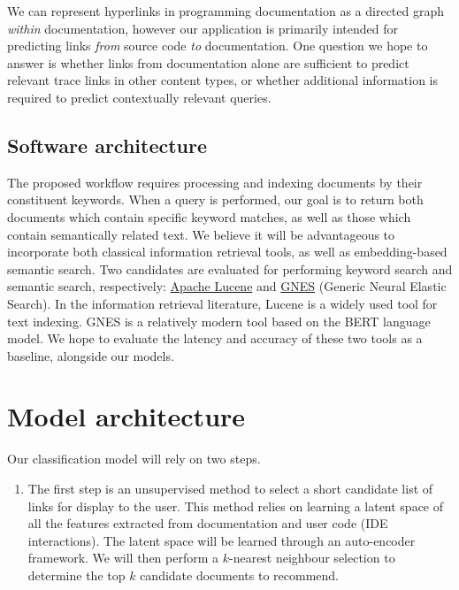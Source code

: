 \documentclass{article}
\begin{document}
We can represent hyperlinks in programming documentation as a directed graph \textit{within} documentation, however our application is primarily intended for predicting links \textit{from} source code \textit{to} documentation. One question we hope to answer is whether links from documentation alone are sufficient to predict relevant trace links in other content types, or whether additional information is required to predict contextually relevant queries.

\begin{multicols}{2}
\subsection{Software architecture}

The proposed workflow requires processing and indexing documents by their constituent keywords. When a query is performed, our goal is to return both documents which contain specific keyword matches, as well as those which contain semantically related text. We believe it will be advantageous to incorporate both classical information retrieval tools, as well as embedding-based semantic search. Two candidates are evaluated for performing keyword search and semantic search, respectively: \href{https://lucene.apache.org/core/}{Apache Lucene} and \href{https://gnes.ai/}{GNES} (Generic Neural Elastic Search). In the information retrieval literature, Lucene is a widely used tool for text indexing. GNES is a relatively modern tool based on the BERT language model. We hope to evaluate the latency and accuracy of these two tools as a baseline, alongside our models.

\section{Model architecture}

Our classification model will rely on two steps.

\begin{enumerate}
    \item  The first step is an unsupervised method to select a short candidate list of links for display to the user.  This method relies on learning a latent space of all the features extracted from documentation and user code (IDE interactions).  The latent space will be learned through an auto-encoder framework.  We will then perform a $k$-nearest neighbour selection  to determine the top $k$ candidate documents to recommend.


\end{enumerate}
\end{multicols}
\end{document}
